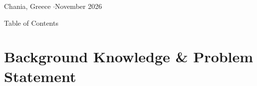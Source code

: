 \documentclass[aspectratio=169]{beamer}
\begin{document}
\begin{frame}[plain]
    \vfill
    {\scriptsize \color{tucgray} Chania, Greece \quad$\cdot$\quad November 2026}
    \vspace{0.3em}
\end{frame}

\begin{frame}{Table of Contents}
    \tableofcontents
\end{frame}


\section{Background Knowledge \& Problem Statement}
\end{document}
